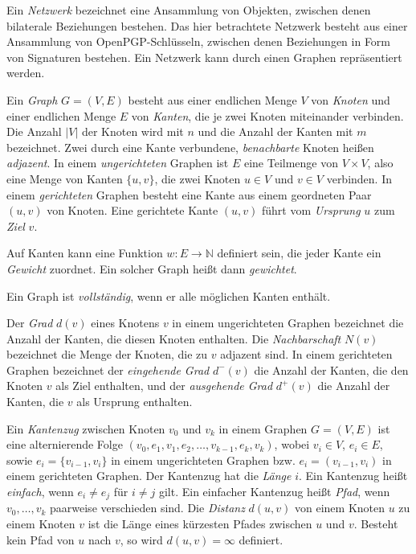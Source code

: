 Ein \emph{Netzwerk} bezeichnet eine Ansammlung von Objekten, zwischen
denen bilaterale Beziehungen bestehen. Das hier betrachtete Netzwerk
besteht aus einer Ansammlung von OpenPGP-Schlüsseln, zwischen denen
Beziehungen in Form von Signaturen bestehen. Ein Netzwerk kann durch einen
Graphen repräsentiert werden.

Ein \emph{Graph} $G=(V, E)$ besteht aus einer endlichen Menge $V$ von
\emph{Knoten} und einer endlichen Menge $E$ von \emph{Kanten}, die je
zwei Knoten miteinander verbinden. Die Anzahl $|V|$ der Knoten wird mit
$n$ und die Anzahl der Kanten mit $m$ bezeichnet. Zwei durch eine
Kante verbundene, \emph{benachbarte} Knoten heißen
\emph{adjazent}. In einem \emph{ungerichteten} Graphen ist $E$ eine
Teilmenge von $V\times V$, also eine Menge von Kanten $\{u, v\}$, die
zwei Knoten $u \in V$ und $v\in V$ verbinden. In einem
\emph{gerichteten} Graphen besteht eine Kante aus einem geordneten
Paar $(u, v)$ von Knoten. Eine gerichtete Kante $(u, v)$ führt vom
\emph{Ursprung} $u$ zum \emph{Ziel} $v$.

Auf Kanten kann eine Funktion $w: E \rightarrow \mathbb{N}$ definiert
sein, die jeder Kante ein \emph{Gewicht} zuordnet. Ein solcher Graph
heißt dann \emph{gewichtet}.

Ein Graph ist \emph{vollständig}, wenn er alle möglichen Kanten
enthält.

Der \emph{Grad} $d(v)$ eines Knotens $v$ in einem ungerichteten
Graphen bezeichnet die Anzahl der Kanten, die diesen Knoten
enthalten. Die \emph{Nachbarschaft} $N(v)$ bezeichnet die Menge der
Knoten, die zu $v$ adjazent sind. In einem gerichteten Graphen
bezeichnet der \emph{eingehende Grad} $d^{-}(v)$ die Anzahl der
Kanten, die den Knoten $v$ als Ziel enthalten, und der
\emph{ausgehende Grad} $d^{+}(v)$ die Anzahl der Kanten, die $v$ als
Ursprung enthalten.

Ein \emph{Kantenzug} zwischen Knoten $v_0$ und $v_k$ in einem Graphen
$G=(V, E)$ ist eine alternierende Folge $(v_0, e_1, v_1, e_2, \dots,
v_{k-1}, e_k, v_k)$, wobei $v_i \in V$, $e_i \in E$, sowie $e_i =
\{v_{i-1}, v_{i}\}$ in einem ungerichteten Graphen bzw. $e_i =
(v_{i-1}, v_{i})$ in einem gerichteten Graphen. Der Kantenzug hat die
\emph{Länge} $i$. Ein Kantenzug heißt \emph{einfach}, wenn $e_i \ne
e_j$ für $i \ne j$ gilt.  Ein einfacher Kantenzug heißt
\emph{Pfad}, wenn $v_0, \dots, v_k$ paarweise verschieden sind. Die
\emph{Distanz} $d(u, v)$ von einem Knoten $u$ zu einem Knoten $v$ ist die
Länge eines kürzesten Pfades zwischen $u$ und $v$. Besteht kein
Pfad von $u$ nach $v$, so wird $d(u,v) = \infty$ definiert.

